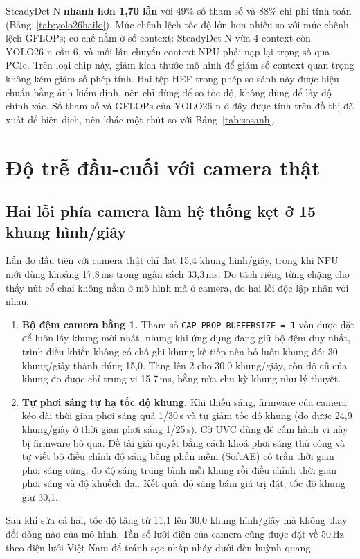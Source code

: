 SteadyDet-N \textbf{nhanh hơn 1,70 lần} với 49\% số tham số và 88\% chi phí tính toán (Bảng~\ref{tab:yolo26hailo}). Mức chênh lệch tốc độ lớn hơn nhiều so với mức chênh lệch GFLOPs; cơ chế nằm ở số context: SteadyDet-N vừa 4 context còn YOLO26-n cần 6, và mỗi lần chuyển context NPU phải nạp lại trọng số qua PCIe. Trên loại chip này, giảm kích thước mô hình để giảm số context quan trọng không kém giảm số phép tính. Hai tệp HEF trong phép so sánh này được hiệu chuẩn bằng ảnh kiểm định, nên chỉ dùng để so tốc độ, không dùng để lấy độ chính xác. Số tham số và GFLOPs của YOLO26-n ở đây được tính trên đồ thị đã xuất để biên dịch, nên khác một chút so với Bảng~\ref{tab:sosanh}.

\section{Độ trễ đầu-cuối với camera thật}
\label{sec:e2e}

\subsection{Hai lỗi phía camera làm hệ thống kẹt ở 15 khung hình/giây}

Lần đo đầu tiên với camera thật chỉ đạt 15,4 khung hình/giây, trong khi NPU mới dùng khoảng 17,8\,ms trong ngân sách 33,3\,ms. Đo tách riêng từng chặng cho thấy nút cổ chai không nằm ở mô hình mà ở camera, do hai lỗi độc lập nhân với nhau:
\begin{enumerate}
\item \textbf{Bộ đệm camera bằng 1.} Tham số \texttt{CAP\_PROP\_BUFFERSIZE = 1} vốn được đặt để luôn lấy khung mới nhất, nhưng khi ứng dụng đang giữ bộ đệm duy nhất, trình điều khiển không có chỗ ghi khung kế tiếp nên bỏ luôn khung đó: 30 khung/giây thành đúng 15,0. Tăng lên 2 cho 30,0 khung/giây, còn độ cũ của khung đo được chỉ trung vị 15,7\,ms, bằng nửa chu kỳ khung như lý thuyết.
\item \textbf{Tự phơi sáng tự hạ tốc độ khung.} Khi thiếu sáng, firmware của camera kéo dài thời gian phơi sáng quá 1/30\,s và tự giảm tốc độ khung (đo được 24,9 khung/giây ở thời gian phơi sáng 1/25\,s). Cờ UVC dùng để cấm hành vi này bị firmware bỏ qua. Đề tài giải quyết bằng cách khoá phơi sáng thủ công và tự viết bộ điều chỉnh độ sáng bằng phần mềm (SoftAE) có trần thời gian phơi sáng cứng: đo độ sáng trung bình mỗi khung rồi điều chỉnh thời gian phơi sáng và độ khuếch đại. Kết quả: độ sáng bám giá trị đặt, tốc độ khung giữ 30,1.
\end{enumerate}
Sau khi sửa cả hai, tốc độ tăng từ 11,1 lên 30,0 khung hình/giây mà không thay đổi dòng nào của mô hình. Tần số lưới điện của camera cũng được đặt về 50\,Hz theo điện lưới Việt Nam để tránh sọc nhấp nháy dưới đèn huỳnh quang.

